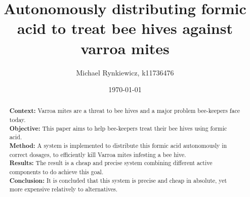 \documentclass[11pt]{article}
\title{Autonomously distributing formic acid \linebreak to treat bee hives against varroa mites }
\author{Michael Rynkiewicz, k11736476}
\date{\today}
\begin{document}
    \maketitle

    \begin{abstract}
        \textbf{Context:} Varroa mites are a threat to bee hives and a major problem bee-keepers face today. \\
        \textbf{Objective:} This paper aims to help bee-keepers treat their bee hives using formic acid. \\
        \textbf{Method:} A system is implemented to distribute this formic acid autonomously in correct dosages, to efficiently kill Varroa mites infesting a bee hive. \\
        \textbf{Results:} The result is a cheap and precise system combining different active components to do achieve this goal. \\
        \textbf{Conclusion:} It is concluded that this system is precise and cheap in absolute, yet more expensive relatively to alternatives. \\
    \end{abstract}

    \tableofcontents
    \newpage

    

    

    

    

    \newpage
    \printbibliography
\end{document}
